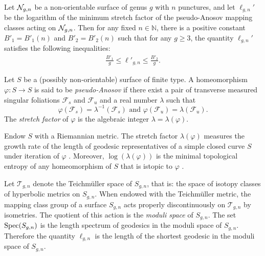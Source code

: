 \begin{thm}\label{thm:stretch1}
  Let $\mathcal{N}_{g,n}$ be a non-orientable surface of genus $g$ with $n$ punctures, and let $\ell_{g,n}'$ be the logarithm of
  the minimum stretch factor of the pseudo-Anosov mapping classes acting on $\mathcal{N}_{g,n}$.
  Then for any fixed $n \in \mathbb{N}$, there is a positive constant $B'_1 = B'_1(n)$ and $B'_2 = B'_2(n)$ such
  that for any $g \geq 3$,
  the quantity $\ell_{g,n}'$ satisfies the following inequalities:
  \begin{align*}
    \frac{B'_1}{g} \leq \ell'_{g,n} \leq \frac{B'_2}{g}.
  \end{align*}
\end{thm}


 Let $S$ be a (possibly non-orientable) surface of finite type.  A homeomorphism $\varphi:S\rightarrow S$ is said to be {\it pseudo-Anosov} if there exist a pair of transverse measured singular foliations $\mathcal{F}_s$ and $\mathcal{F}_u$ and a real number $\lambda$ such that $$\varphi(\mathcal{F}_s)=\lambda^{-1}(\mathcal{F}_s)\text{ and } \varphi(\mathcal{F}_u)=\lambda(\mathcal{F}_u).$$  The {\it stretch factor} of $\varphi$ is the algebraic integer $\lambda=\lambda(\varphi)$.

Endow $S$ with a Riemannian metric.  The stretch factor $\lambda(\varphi)$ measures the growth rate of the length of geodesic representatives of a simple closed curve $S$ under iteration of $\varphi$ \cite[Proposition 9.21]{FLP}.  Moreover, $\log(\lambda(\varphi))$ is the minimal topological entropy of any homeomorphism of $S$ that is istopic to $\varphi$ \cite[Expos\'e 10]{FLP}.


Let $\mathcal{T}_{g,n}$ denote the Teichm\"uller space of $S_{g,n}$, that is: the space of isotopy classes of hyperbolic metrics on $S_{g,n}$.  
When endowed with the Teichm\"uller metric, the mapping class group of a surface $S_{g,n}$ acts properly discontinuously on $\mathcal{T}_{g,n}$ by isometries.  The quotient of this action is the {\it moduli space} of $S_{g,n}$. The set
$\operatorname{Spec}(S_{g,n})$ is the length spectrum of geodesics in the moduli space of $S_{g,n}$.  Therefore the quantity $\ell_{g,n}$ is the length of the shortest geodesic in the moduli space of $S_{g,n}$.

